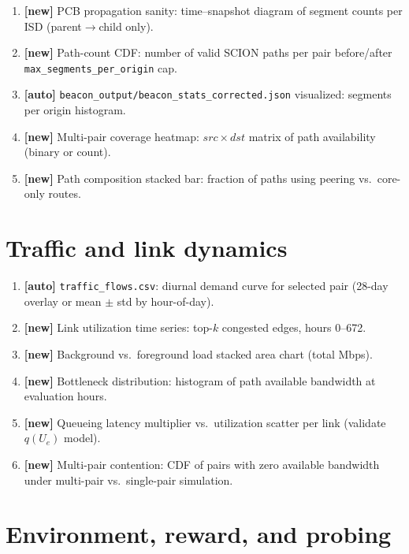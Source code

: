 \documentclass[11pt,a4paper,twoside,openright]{report}
\begin{document}
\begin{enumerate}[resume]
  \item \textbf{[new]} PCB propagation sanity: time--snapshot diagram of segment counts
    per ISD (parent$\rightarrow$child only).
  \item \textbf{[new]} Path-count CDF: number of valid SCION paths per pair before/after
    \texttt{max\_segments\_per\_origin} cap.
  \item \textbf{[auto]} \texttt{beacon\_output/beacon\_stats\_corrected.json} visualized:
    segments per origin histogram.
  \item \textbf{[new]} Multi-pair coverage heatmap: $src \times dst$ matrix of path
    availability (binary or count).
  \item \textbf{[new]} Path composition stacked bar: fraction of paths using
    peering vs.\ core-only routes.
\end{enumerate}

\section{Traffic and link dynamics}

\begin{enumerate}[resume]
  \item \textbf{[auto]} \texttt{traffic\_flows.csv}: diurnal demand curve for selected pair
    (28-day overlay or mean $\pm$ std by hour-of-day).
  \item \textbf{[new]} Link utilization time series: top-$k$ congested edges, hours 0--672.
  \item \textbf{[new]} Background vs.\ foreground load stacked area chart (total Mbps).
  \item \textbf{[new]} Bottleneck distribution: histogram of path available bandwidth
    at evaluation hours.
  \item \textbf{[new]} Queueing latency multiplier vs.\ utilization scatter per link
    (validate $q(U_e)$ model).
  \item \textbf{[new]} Multi-pair contention: CDF of pairs with zero available bandwidth
    under multi-pair vs.\ single-pair simulation.
\end{enumerate}

\section{Environment, reward, and probing}
\end{document}
